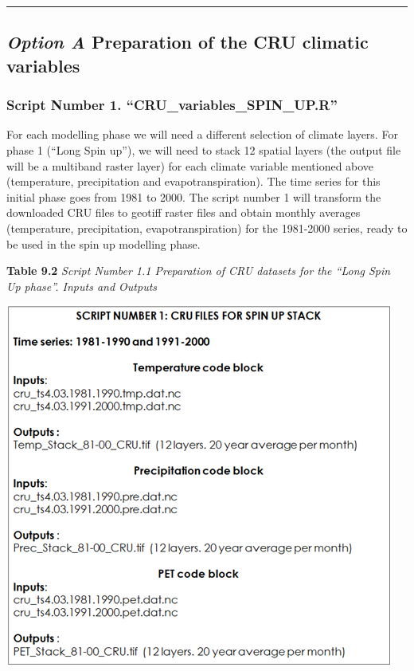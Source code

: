 \documentclass[
  10pt,
  b5paper,
]{book}
\begin{document}
\begin{center}\rule{0.5\linewidth}{0.5pt}\end{center}

\hypertarget{option-a-preparation-of-the-cru-climatic-variables}{%
\subsection{\texorpdfstring{\emph{Option A} Preparation of the CRU climatic variables}{Option A Preparation of the CRU climatic variables}}\label{option-a-preparation-of-the-cru-climatic-variables}}

\hypertarget{script-number-1.-cru_variables_spin_up.r}{%
\subsubsection{Script Number 1. ``CRU\_variables\_SPIN\_UP.R''}\label{script-number-1.-cru_variables_spin_up.r}}

For each modelling phase we will need a different selection of climate layers. For phase 1 (``Long Spin up''), we will need to stack 12 spatial layers (the output file will be a multiband raster layer) for each climate variable mentioned above (temperature, precipitation and evapotranspiration). The time series for this initial phase goes from 1981 to 2000. The script number 1 will transform the downloaded CRU files to geotiff raster files and obtain monthly averages (temperature, precipitation, evapotranspiration) for the 1981-2000 series, ready to be used in the spin up modelling phase.

\textbf{Table 9.2} \emph{Script Number 1.1 Preparation of CRU datasets for the ``Long Spin Up phase''. Inputs and Outputs}

\includegraphics{tables/Table_9.1.png}
\end{document}
